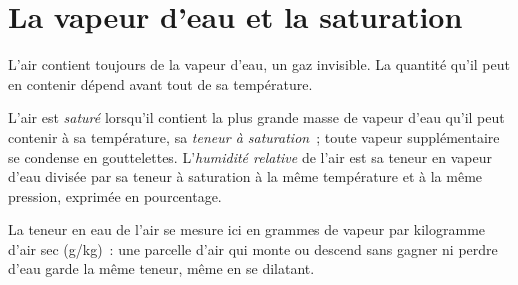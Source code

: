 \section{La vapeur d'eau et la saturation}

L'air contient toujours de la vapeur d'eau, un gaz invisible. La quantité
qu'il peut en contenir dépend avant tout de sa température.

\begin{definition}\label{def:g10:why-clouds-form:humidity}
L'air est \emph{saturé} lorsqu'il contient la plus grande
masse de vapeur d'eau qu'il peut contenir à sa température, sa \emph{teneur
à saturation}~; toute vapeur supplémentaire se condense en gouttelettes.
L'\emph{humidité relative} de
l'air est sa teneur en vapeur d'eau divisée par sa teneur à saturation à la
même température et à la même pression, exprimée en pourcentage.
\end{definition}

La teneur en eau de l'air se mesure ici en grammes de vapeur par kilogramme
d'air sec (\unit{g/kg})~: une parcelle d'air qui monte ou descend sans
gagner ni perdre d'eau garde la même teneur, même en se dilatant.

